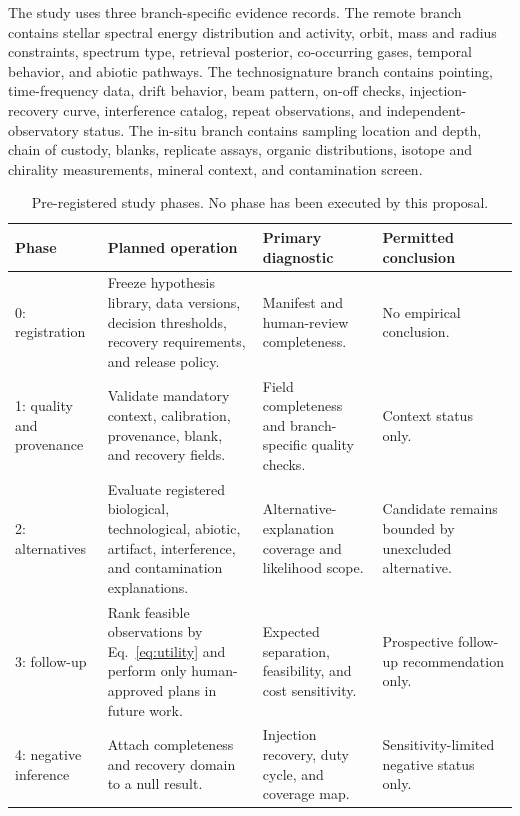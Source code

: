 \documentclass[conference]{IEEEtran}
\begin{document}
The study uses three branch-specific evidence records. The remote branch contains stellar spectral energy distribution and activity, orbit, mass and radius constraints, spectrum type, retrieval posterior, co-occurring gases, temporal behavior, and abiotic pathways. The technosignature branch contains pointing, time-frequency data, drift behavior, beam pattern, on-off checks, injection-recovery curve, interference catalog, repeat observations, and independent-observatory status. The in-situ branch contains sampling location and depth, chain of custody, blanks, replicate assays, organic distributions, isotope and chirality measurements, mineral context, and contamination screen.

\begin{table}[t]
\caption{Pre-registered study phases. No phase has been executed by this proposal.}
\label{tab:design}
\centering
\footnotesize
\setlength{\tabcolsep}{3pt}
\begin{tabular}{p{} p{} p{} p{}}
\hline
\textbf{Phase} & \textbf{Planned operation} & \textbf{Primary diagnostic} & \textbf{Permitted conclusion}\\
\hline
0: registration & Freeze hypothesis library, data versions, decision thresholds, recovery requirements, and release policy. & Manifest and human-review completeness. & No empirical conclusion.\\
1: quality and provenance & Validate mandatory context, calibration, provenance, blank, and recovery fields. & Field completeness and branch-specific quality checks. & Context status only.\\
2: alternatives & Evaluate registered biological, technological, abiotic, artifact, interference, and contamination explanations. & Alternative-explanation coverage and likelihood scope. & Candidate remains bounded by unexcluded alternative.\\
3: follow-up & Rank feasible observations by Eq.~\eqref{eq:utility} and perform only human-approved plans in future work. & Expected separation, feasibility, and cost sensitivity. & Prospective follow-up recommendation only.\\
4: negative inference & Attach completeness and recovery domain to a null result. & Injection recovery, duty cycle, and coverage map. & Sensitivity-limited negative status only.\\
\hline
\end{tabular}
\end{table}
\end{document}
